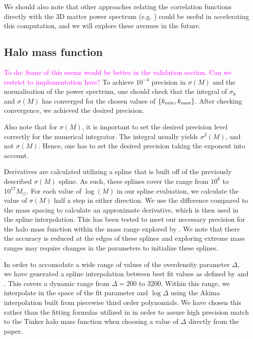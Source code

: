 \documentclass[\docopts]{\docclass}
\newcommand{\todo}[1]{\textcolor{magenta}{To do: #1}}
\begin{document}
We should also note that other approaches relating the correlation functions directly with the 3D matter power spectrum (e.g. \citealt{2017ApJ...845...28C}) could be useful in accelerating this computation, and we will explore these avenues in the future.




\subsection{Halo mass function}

\todo{Some of this seems would be better in the validation section. Can we restrict to implementation here?}
To achieve $10^{-4}$ precision in $\sigma(M)$ and the normalisation of the power spectrum, one should check that the integral of $\sigma_8$ and $\sigma(M)$ has converged for the chosen values of $\{k_{\rm min},k_{\rm max}\}$. After checking convergence, we achieved the desired precision.

Also note that for $\sigma(M)$, it is important to set the desired precision level correctly for the numerical integrator. The integral usually yields $\sigma^2(M)$, and not $\sigma(M)$. Hence, one has to set the desired precision taking the exponent into account.

Derivatives are calculated utilizing a spline that is built off of the previously described $\sigma(M)$ spline. As such, these splines cover the range from $10^6$ to $10^{17} M_\odot$. For each value of $\log(M)$ in our spline evaluation, we calculate the value of $\sigma(M)$ half a step in either direction. We use the difference compared to the mass spacing to calculate an approximate derivative, which is then used in the spline interpolation. This has been tested to meet our necessary precision for the halo mass function within the mass range explored by \citet{Tinker2010}. We note that there the accuracy is reduced at the edges of these splines and exploring extreme mass ranges may require changes in the parameters to initialize these splines.

In order to accomodate a wide range of values of the overdensity parameter $\Delta$, we have generated a spline interpolation between best fit values as defined by \citet{Tinker2008} and \citet{Tinker2010}. This covers a dynamic range from $\Delta=200$ to $3200$. Within this range, we interpolate in the space of the fit parameter and $\log\Delta$ using the Akima interpolation built from piecewise third order polynomials. We have chosen this rather than the fitting formulas utilized in \citet{Tinker2010} in order to assure high precision match to the Tinker halo mass function when choosing a value of $\Delta$ directly from the paper. 
\end{document}
